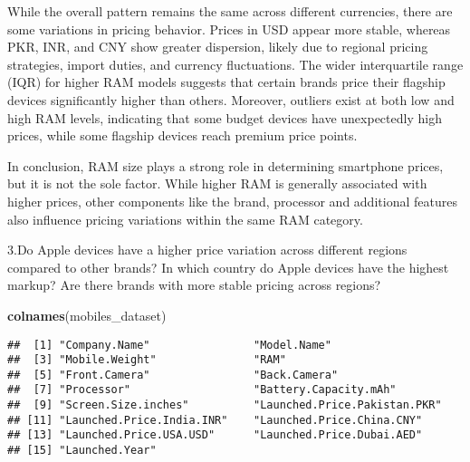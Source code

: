 \documentclass[
]{article}
\newenvironment{Shaded}{\begin{snugshade}}{\end{snugshade}}
\newcommand{\FunctionTok}[1]{\textcolor[rgb]{0.13,0.29,0.53}{\textbf{#1}}}
\newcommand{\NormalTok}[1]{#1}
\begin{document}
While the overall pattern remains the same across different currencies,
there are some variations in pricing behavior. Prices in USD appear more
stable, whereas PKR, INR, and CNY show greater dispersion, likely due to
regional pricing strategies, import duties, and currency fluctuations.
The wider interquartile range (IQR) for higher RAM models suggests that
certain brands price their flagship devices significantly higher than
others. Moreover, outliers exist at both low and high RAM levels,
indicating that some budget devices have unexpectedly high prices, while
some flagship devices reach premium price points.

In conclusion, RAM size plays a strong role in determining smartphone
prices, but it is not the sole factor. While higher RAM is generally
associated with higher prices, other components like the brand,
processor and additional features also influence pricing variations
within the same RAM category.

3.Do Apple devices have a higher price variation across different
regions compared to other brands? In which country do Apple devices have
the highest markup? Are there brands with more stable pricing across
regions?

\begin{Shaded}
\begin{Highlighting}[]
\FunctionTok{colnames}\NormalTok{(mobiles\_dataset)}
\end{Highlighting}
\end{Shaded}

\begin{verbatim}
##  [1] "Company.Name"                "Model.Name"                 
##  [3] "Mobile.Weight"               "RAM"                        
##  [5] "Front.Camera"                "Back.Camera"                
##  [7] "Processor"                   "Battery.Capacity.mAh"       
##  [9] "Screen.Size.inches"          "Launched.Price.Pakistan.PKR"
## [11] "Launched.Price.India.INR"    "Launched.Price.China.CNY"   
## [13] "Launched.Price.USA.USD"      "Launched.Price.Dubai.AED"   
## [15] "Launched.Year"
\end{verbatim}
\end{document}
